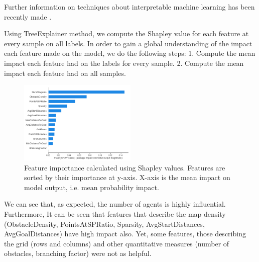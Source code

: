 \documentclass[letterpaper]{article} %
\begin{document}
Further information on techniques about interpretable machine learning has been recently made \cite{du2018techniques}.

Using TreeExplainer method, we compute the Shapley value for each feature at every sample on all labels. In order to gain a global understanding of the impact each feature made on the model, we do the following steps:
1. Compute the mean impact each feature had on the labels for every sample.
2. Compute the mean impact each feature had on all samples.

\begin{figure}[h]
    \centering
    \includegraphics[width=0.5\textwidth]{Charts/mean_all_classes.png}
    \caption{Feature importance calculated using Shapley values. Features are sorted by their importance at y-axis. X-axis is the mean impact on model output, i.e. mean probability impact.}
    \label{fig:FeatureImportance}
\end{figure}

We can see that, as expected, the number of agents is highly influential.
Furthermore, It can be seen that features that describe the map density (ObstacleDensity, PointsAtSPRatio, Sparsity, AvgStartDistances, AvgGoalDistances) have high impact also.
Yet, some features, those describing the grid (rows and columns) and other quantitative measures (number of obstacles, branching factor) were not as helpful.

\end{document}

